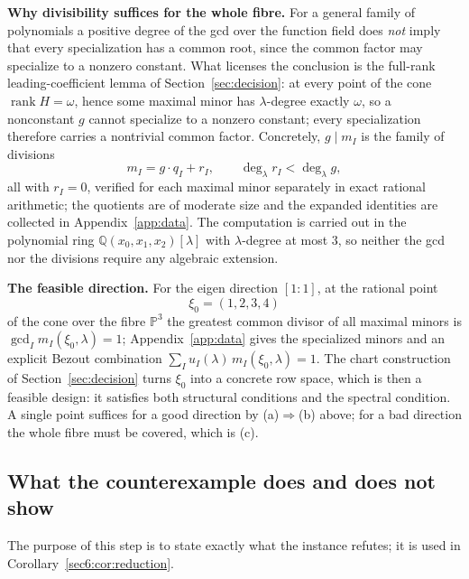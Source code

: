 \documentclass[journal]{IEEEtran}
\theoremstyle{plainn}
\theoremstyle{remark}
\newcommand{\rank}{\operatorname{rank}}
\begin{document}
\textbf{Why divisibility suffices for the whole fibre.} For a general family of polynomials a positive
degree of the gcd over the function field does \emph{not} imply that every specialization has a common
root, since the common factor may specialize to a nonzero constant. What licenses the conclusion is the
full-rank leading-coefficient lemma of Section~\ref{sec:decision}: at every point of the cone
$\rank H=\omega$, hence some maximal minor has $\lambda$-degree exactly $\omega$, so a nonconstant $g$
cannot specialize to a nonzero constant; every specialization therefore carries a nontrivial common
factor. Concretely, $g\mid m_I$ is the family of divisions
\begin{equation}\label{sec6:eq:division}
m_I=g\cdot q_I+r_I,\qquad \deg_\lambda r_I<\deg_\lambda g,
\end{equation}
all with $r_I=0$, verified for each maximal minor separately in exact rational arithmetic; the
quotients are of moderate size and the expanded identities are collected in Appendix~\ref{app:data}.
The computation is carried out in the polynomial ring $\mathbb{Q}(x_0,x_1,x_2)[\lambda]$ with
$\lambda$-degree at most $3$, so neither the gcd nor the divisions require any algebraic extension.

\textbf{The feasible direction.} For the eigen direction $[1\!:\!1]$, at the rational point
\begin{equation}\label{sec6:eq:x0}
\xi_0=(1,2,3,4)
\end{equation}
of the cone over the fibre $\mathbb{P}^{3}$ the greatest common divisor of all maximal minors is
$\gcd_I m_I(\xi_0,\lambda)=1$; Appendix~\ref{app:data} gives the specialized minors and an explicit
Bezout combination $\sum_I u_I(\lambda)\,m_I(\xi_0,\lambda)=1$. The chart construction of
Section~\ref{sec:decision} turns $\xi_0$ into a concrete row space, which is then a feasible design: it
satisfies both structural conditions and the spectral condition. A single point suffices for a good
direction by (a)$\Rightarrow$(b) above; for a bad direction the whole fibre must be covered, which is
(c).


\subsection{What the counterexample does and does not show}\label{app:example:wording}



The purpose of this step is to state exactly what the instance refutes; it is used in
Corollary~\ref{sec6:cor:reduction}.
\end{document}
